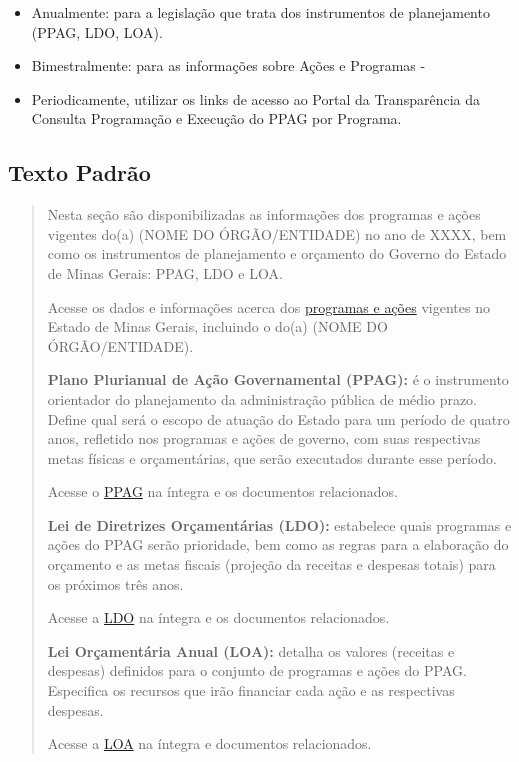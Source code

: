 \documentclass[
]{book}
\providecommand{\tightlist}{%
  \setlength{\itemsep}{0pt}\setlength{\parskip}{0pt}}
\begin{document}
\begin{itemize}
\tightlist
\item
  Anualmente: para a legislação que trata dos instrumentos de planejamento (PPAG, LDO, LOA).
\item
  Bimestralmente: para as informações sobre Ações e Programas -
\item
  Periodicamente, utilizar os links de acesso ao Portal da Transparência da Consulta Programação e Execução do PPAG por Programa.
\end{itemize}

\hypertarget{texto-padruxe3o-3}{%
\subsection{Texto Padrão}\label{texto-padruxe3o-3}}

\begin{quote}
Nesta seção são disponibilizadas as informações dos programas e ações vigentes do(a) (NOME DO ÓRGÃO/ENTIDADE) no ano de XXXX, bem como os instrumentos de planejamento e orçamento do Governo do Estado de Minas Gerais: PPAG, LDO e LOA.

Acesse os dados e informações acerca dos \href{http://www.transparencia.mg.gov.br/planejamento-e-resultados/planejamento-e-monitoramento/programacao-execucao-ppag-programa/ppagprograma-programas/4/2019/0/0}{programas e ações} vigentes no Estado de Minas Gerais, incluindo o do(a) (NOME DO ÓRGÃO/ENTIDADE).

\textbf{Plano Plurianual de Ação Governamental (PPAG):} é o instrumento orientador do planejamento da administração pública de médio prazo. Define qual será o escopo de atuação do Estado para um período de quatro anos, refletido nos programas e ações de governo, com suas respectivas metas físicas e orçamentárias, que serão executados durante esse período.

Acesse o \href{http://transparencia.mg.gov.br/planejamento-e-resultados}{PPAG} na íntegra e os documentos relacionados.

\textbf{Lei de Diretrizes Orçamentárias (LDO):} estabelece quais programas e ações do PPAG serão prioridade, bem como as regras para a elaboração do orçamento e as metas fiscais (projeção da receitas e despesas totais) para os próximos três anos.

Acesse a \href{http://transparencia.mg.gov.br/planejamento-e-resultados}{LDO} na íntegra e os documentos relacionados.

\textbf{Lei Orçamentária Anual (LOA):} detalha os valores (receitas e despesas) definidos para o conjunto de programas e ações do PPAG. Especifica os recursos que irão financiar cada ação e as respectivas despesas.

Acesse a \href{http://transparencia.mg.gov.br/planejamento-e-resultados}{LOA} na íntegra e documentos relacionados.
\end{quote}
\end{document}
